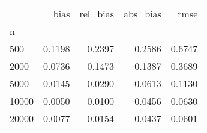 \begin{tabular}{lrrrr}
\toprule
{} &   bias &  rel\_bias &  abs\_bias &   rmse \\
n     &        &           &           &        \\
\midrule
500   & 0.1198 &    0.2397 &    0.2586 & 0.6747 \\
2000  & 0.0736 &    0.1473 &    0.1387 & 0.3689 \\
5000  & 0.0145 &    0.0290 &    0.0613 & 0.1130 \\
10000 & 0.0050 &    0.0100 &    0.0456 & 0.0630 \\
20000 & 0.0077 &    0.0154 &    0.0437 & 0.0601 \\
\bottomrule
\end{tabular}
